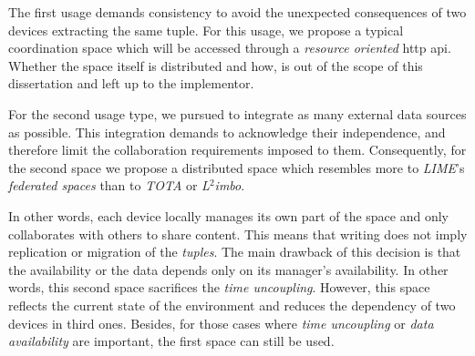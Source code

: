 The first usage demands consistency to avoid the unexpected consequences of two devices extracting the same tuple.
For this usage, we propose a typical coordination space which will be accessed through a \emph{resource oriented} \ac{http} \ac{api}.
Whether the space itself is distributed and how, is out of the scope of this dissertation and left up to the implementor.


For the second usage type, we pursued to integrate as many external data sources as possible.
This integration demands to acknowledge their independence, and therefore limit the collaboration requirements imposed to them.
Consequently, for the second space we propose a distributed space which resembles more to \emph{LIME}'s \emph{federated spaces} than to \emph{TOTA} or \emph{L$^2$imbo}.


In other words, each device locally manages its own part of the space and only collaborates with others to share content.
This means that writing does not imply replication or migration of the \emph{tuples}.
The main drawback of this decision is that the availability or the data depends only on its manager's availability.
In other words, this second space sacrifices the \emph{time uncoupling}.
However, this space reflects the current state of the environment and reduces the dependency of two devices in third ones.
Besides, for those cases where \emph{time uncoupling} or \emph{data availability} are important, the first space can still be used.
